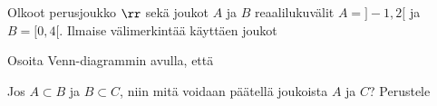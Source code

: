 \begin{tehtavasivu}
\begin{tehtava}
\begin{vastaus}
        \begin{alakohdat}
        \alakohta{-} %
        \end{alakohdat}
    \end{vastaus}
\end{tehtava}

\begin{tehtava}
Olkoot perusjoukko $\rr$ sekä joukot $A$ ja $B$ reaalilukuvälit $A=]-1, 2[$ ja $B=[0, 4[$. Ilmaise välimerkintää käyttäen joukot
    \begin{alakohdat}
    \end{alakohdat}

    \begin{vastaus}
    
        \begin{alakohdat}
        \alakohta{}
        \alakohta{}
        \alakohta{}
        \alakohta{}
        \alakohta{}
        \alakohta{} 
        \end{alakohdat}
    \end{vastaus}
\end{tehtava}


\begin{tehtava}
Osoita Venn-diagrammin avulla, että
    \begin{alakohdat}
        \alakohta{\[
X\setminus (A\cup B) = (X\setminus A)\cap (X\setminus B),
\]}
        \alakohta{\[
X \setminus (A\cap B) = (X\setminus A)\cup (X\setminus B).
\]}
      
    \end{alakohdat}

    \begin{vastaus}
    
        \begin{alakohdat}
        \alakohta{}
        \alakohta{}
        \end{alakohdat}
    \end{vastaus}
\end{tehtava}


\begin{tehtava}
Jos $A\subset B$ ja $B\subset C$, niin mitä voidaan päätellä joukoista $A$ ja $C$? Perustele 
    \begin{alakohdat}
    \end{alakohdat}


\end{tehtava}
\end{tehtavasivu}
